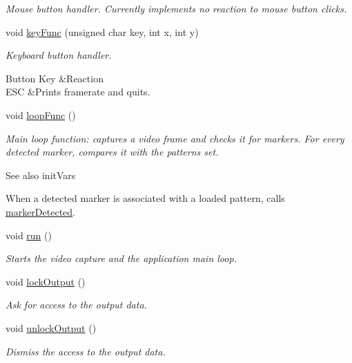 \begin{DoxyCompactItemize}
\begin{DoxyCompactList}\small\item\em \-Mouse button handler. \-Currently implements no reaction to mouse button clicks. \end{DoxyCompactList}\item 
void \hyperlink{namespacecg_1_1pi_1_1ar_a4a7af9e3d70418c8461519dc9f82ec71}{key\-Func} (unsigned char key, int x, int y)
\begin{DoxyCompactList}\small\item\em \-Keyboard button handler. \begin{TabularC}{2}
\hline
\-Button \-Key &\-Reaction  \\
\-E\-S\-C &\-Prints framerate and quits.  \\
\end{TabularC}
\end{DoxyCompactList}\item 
void \hyperlink{namespacecg_1_1pi_1_1ar_a7368a118340f3f79ae5ff24d75ac9041}{loop\-Func} ()
\begin{DoxyCompactList}\small\item\em \-Main loop function\-: captures a video frame and checks it for markers. \-For every detected marker, compares it with the patterns set.\begin{DoxySeeAlso}{\-See also}
init\-Vars


\end{DoxySeeAlso}
\-When a detected marker is associated with a loaded pattern, calls \hyperlink{namespacecg_1_1pi_1_1ar_afefc10089c39a2f9ff586acfff13020a}{marker\-Detected}. \end{DoxyCompactList}\item 
void \hyperlink{namespacecg_1_1pi_1_1ar_a8a0f3d10242ff8f4491b1b376ea8bf09}{run} ()
\begin{DoxyCompactList}\small\item\em \-Starts the video capture and the application main loop. \end{DoxyCompactList}\item 
void \hyperlink{namespacecg_1_1pi_1_1ar_a231a9527f1d785d52b483821b8e4afd9}{lock\-Output} ()
\begin{DoxyCompactList}\small\item\em \-Ask for access to the output data. \end{DoxyCompactList}\item 
void \hyperlink{namespacecg_1_1pi_1_1ar_a975cc0ca7a96016024e8cebb34550de4}{unlock\-Output} ()
\begin{DoxyCompactList}\small\item\em \-Dismiss the access to the output data. \end{DoxyCompactList}\end{DoxyCompactItemize}
